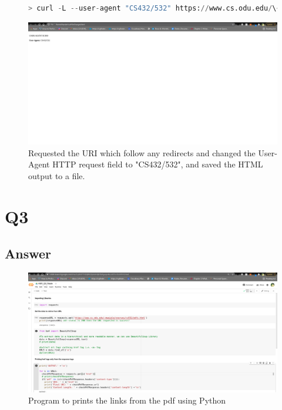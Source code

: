 \documentclass[12pt]{article}
\begin{document}
\begin{figure}
   
\begin{lstlisting}[language=Python, caption=Python example copied into the LaTeX, label=lst:copy]
> curl -L --user-agent "CS432/532" https://www.cs.odu.edu/\~mweigle/courses/cs532/ua_echo.php -o curlFileChanged.html

\end{lstlisting}
    \centering
    \includegraphics[trim=0 20 10 50, clip, width=\textwidth] {Q2_3.png}
    \caption{Requested the URI which follow any redirects and changed the User-Agent HTTP request field to "CS432/532", and saved the HTML output to a file.}
    \label{fig:web-growth}
\end{figure}


\section*{Q3}

\subsection*{Answer}

\begin{figure}[h]
    \centering
    \includegraphics[trim=0 20 10 50, clip, width=\textwidth] {HW1.png}
    \caption{Program to prints the links from the pdf using Python}
    \label{fig:web-growth}
\end{figure}
\end{document}
